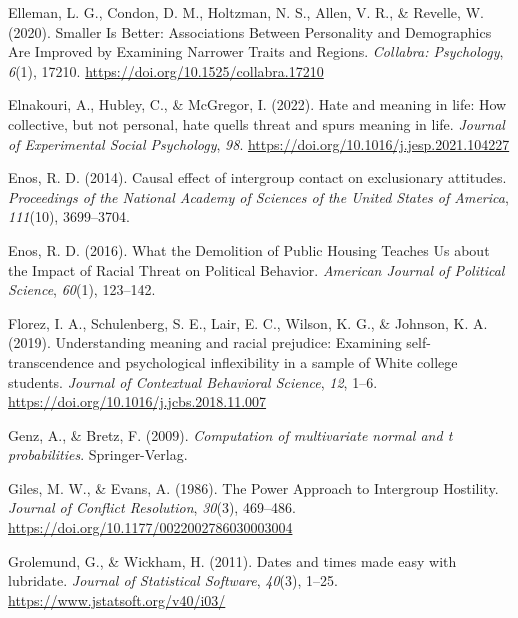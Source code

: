 \documentclass[
  man,floatsintext]{apa7}
\newlength{\cslhangindent}
\newlength{\cslentryspacingunit} %
\newenvironment{CSLReferences}[2] %
 {%
  \setlength{\parindent}{0pt}
  \ifodd #1
  \let\oldpar\par
  \def\par{\hangindent=\cslhangindent\oldpar}
  \fi
  \setlength{\parskip}{#2\cslentryspacingunit}
 }%
 {}
\begin{document}
\begin{CSLReferences}{1}{0}
\leavevmode{}%
Elleman, L. G., Condon, D. M., Holtzman, N. S., Allen, V. R., \& Revelle, W. (2020). Smaller {Is Better}: {Associations Between Personality} and {Demographics Are Improved} by {Examining Narrower Traits} and {Regions}. \emph{Collabra: Psychology}, \emph{6}(1), 17210. \url{https://doi.org/10.1525/collabra.17210}

\leavevmode{}%
Elnakouri, A., Hubley, C., \& McGregor, I. (2022). Hate and meaning in life: {How} collective, but not personal, hate quells threat and spurs meaning in life. \emph{Journal of Experimental Social Psychology}, \emph{98}. \url{https://doi.org/10.1016/j.jesp.2021.104227}

\leavevmode{}%
Enos, R. D. (2014). Causal effect of intergroup contact on exclusionary attitudes. \emph{Proceedings of the National Academy of Sciences of the United States of America}, \emph{111}(10), 3699--3704.

\leavevmode{}%
Enos, R. D. (2016). What the {Demolition} of {Public Housing Teaches Us} about the {Impact} of {Racial Threat} on {Political Behavior}. \emph{American Journal of Political Science}, \emph{60}(1), 123--142.

\leavevmode{}%
Florez, I. A., Schulenberg, S. E., Lair, E. C., Wilson, K. G., \& Johnson, K. A. (2019). Understanding meaning and racial prejudice: {Examining} self-transcendence and psychological inflexibility in a sample of {White} college students. \emph{Journal of Contextual Behavioral Science}, \emph{12}, 1--6. \url{https://doi.org/10.1016/j.jcbs.2018.11.007}

\leavevmode{}%
Genz, A., \& Bretz, F. (2009). \emph{Computation of multivariate normal and t probabilities}. Springer-Verlag.

\leavevmode{}%
Giles, M. W., \& Evans, A. (1986). The {Power Approach} to {Intergroup Hostility}. \emph{Journal of Conflict Resolution}, \emph{30}(3), 469--486. \url{https://doi.org/10.1177/0022002786030003004}

\leavevmode{}%
Grolemund, G., \& Wickham, H. (2011). Dates and times made easy with {lubridate}. \emph{Journal of Statistical Software}, \emph{40}(3), 1--25. \url{https://www.jstatsoft.org/v40/i03/}


\end{CSLReferences}
\end{document}
